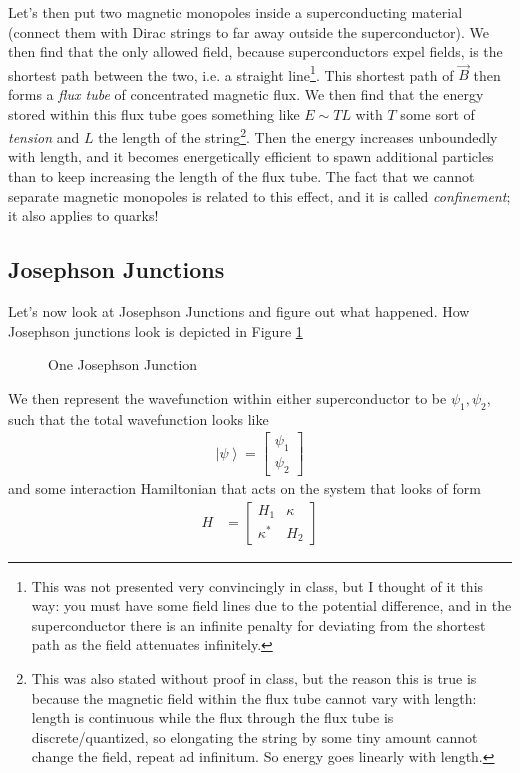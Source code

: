 \documentclass[12pt]{article}
\newcommand{\ket}[1]{\left|#1\right>}
\begin{document}
Let's then put two magnetic monopoles inside a superconducting material (connect them with Dirac strings to far away outside the superconductor). We then find that the only allowed field, because superconductors expel fields, is the shortest path between the two, i.e. a straight line\footnote{This was not presented very convincingly in class, but I thought of it this way: you must have some field lines due to the potential difference, and in the superconductor there is an infinite penalty for deviating from the shortest path as the field attenuates infinitely.}. This shortest path of $\vec{B}$ then forms a \emph{flux tube} of concentrated magnetic flux. We then find that the energy stored within this flux tube goes something like $E \sim TL$ with $T$ some sort of \emph{tension} and $L$ the length of the string\footnote{This was also stated without proof in class, but the reason this is true is because the magnetic field within the flux tube cannot vary with length: length is continuous while the flux through the flux tube is discrete/quantized, so elongating the string by some tiny amount cannot change the field, repeat ad infinitum.  So energy goes linearly with length.}. Then the energy increases unboundedly with length, and it becomes energetically efficient to spawn additional particles than to keep increasing the length of the flux tube. The fact that we cannot separate magnetic monopoles is related to this effect, and it is called \emph{confinement}; it also applies to quarks!

\subsection{Josephson Junctions}
Let's now look at Josephson Junctions and figure out what happened. How Josephson junctions look is depicted in Figure \ref{JJ}
\begin{figure}[!h]
    \centering
    \caption{One Josephson Junction}
    \label{JJ}
\end{figure}

We then represent the wavefunction within either superconductor to be $\psi_1, \psi_2$, such that the total wavefunction looks like
\begin{align}
    \ket{\psi} = \begin{bmatrix} \psi_1\\ \psi_2 \end{bmatrix} 
\end{align}
and some interaction Hamiltonian that acts on the system that looks of form
\begin{align}
    H &= \begin{bmatrix} H_1 & \kappa \\ \kappa^* & H_2 \end{bmatrix} 
\end{align}
\end{document}
